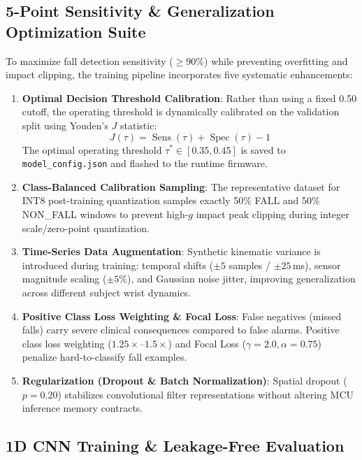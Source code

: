 \subsection{5-Point Sensitivity \& Generalization Optimization Suite}

To maximize fall detection sensitivity (\(\ge 90\%\)) while preventing overfitting and impact clipping, the training pipeline incorporates five systematic enhancements:
\begin{enumerate}
    \item \textbf{Optimal Decision Threshold Calibration}: Rather than using a fixed 0.50 cutoff, the operating threshold is dynamically calibrated on the validation split using Youden's \(J\) statistic:
          \begin{equation}
              J(\tau) = \operatorname{Sens}(\tau) + \operatorname{Spec}(\tau) - 1
          \end{equation}
          The optimal operating threshold \(\tau^* \in [0.35, 0.45]\) is saved to \texttt{model\_config.json} and flashed to the runtime firmware.
    \item \textbf{Class-Balanced Calibration Sampling}: The representative dataset for INT8 post-training quantization samples exactly 50\% FALL and 50\% NON\_FALL windows to prevent high-\(g\) impact peak clipping during integer scale/zero-point quantization.
    \item \textbf{Time-Series Data Augmentation}: Synthetic kinematic variance is introduced during training: temporal shifts (\(\pm 5\) samples / \(\pm 25\)\,ms), sensor magnitude scaling (\(\pm 5\%\)), and Gaussian noise jitter, improving generalization across different subject wrist dynamics.
    \item \textbf{Positive Class Loss Weighting \& Focal Loss}: False negatives (missed falls) carry severe clinical consequences compared to false alarms. Positive class loss weighting (\(1.25\times\text{--}1.5\times\)) and Focal Loss (\(\gamma=2.0, \alpha=0.75\)) penalize hard-to-classify fall examples.
    \item \textbf{Regularization (Dropout \& Batch Normalization)}: Spatial dropout (\(p=0.20\)) stabilizes convolutional filter representations without altering MCU inference memory contracts.
\end{enumerate}

\subsection{1D CNN Training \& Leakage-Free Evaluation}

